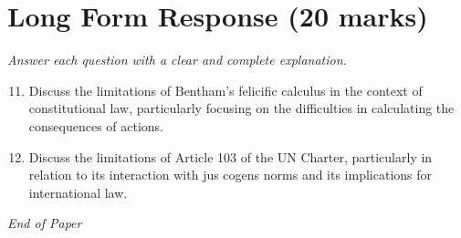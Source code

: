 \documentclass[12pt]{article}
\begin{document}
\section*{Long Form Response (20 marks)}
\textit{Answer each question with a clear and complete explanation.}
\begin{enumerate}[label=\arabic*.]
\setcounter{enumi}{10}
\item Discuss the limitations of Bentham's felicific calculus in the context of constitutional law, particularly focusing on the difficulties in calculating the consequences of actions.
\item Discuss the limitations of Article 103 of the UN Charter, particularly in relation to its interaction with jus cogens norms and its implications for international law.
\end{enumerate}

\vfill
\noindent\textit{End of Paper}
\end{document}
